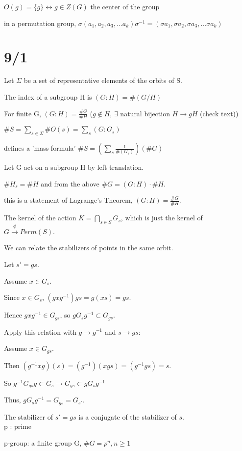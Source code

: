 \documentclass[12pt]{article}
\newcommand{\inv}{^{-1}}
\begin{document}
$O(g) = \{g\} \leftrightarrow g \in Z(G)$ the center of the group

in a permutation group, $\sigma (a_1, a_2, a_3, ... a_k) \sigma^{-1} = (\sigma a_1, \sigma a_2, \sigma a_3, ... \sigma a_k)$

\section{9/1}

\noindent
Let $\Sigma$ be a set of representative elements of the orbits of S.

The index of a subgroup H is $(G : H) = \#(G/H)$

For finite G, $(G:H) = \frac{\#G}{\#H}$ ($g \not \in H$, $\exists$ natural bijection $H \to gH$ (check text))

$\#S = \sum_{s \in \Sigma}\#O(s) = \sum_s(G:G_s)$

defines a 'mass formula' $\#S = (\sum_s\frac{1}{\#(G_s)})(\#G)$

\noindent
Let G act on a subgroup H by left translation.

$\#H_s = \#H$ and from the above $\#G = (G:H) \cdot \#H$. 

this is a statement of Lagrange's Theorem, $(G:H) = \frac{\#G}{\#H}$.

\noindent
The kernel of the action $K = \bigcap_{s \in S}G_s$, which is just the kernel of $G \xrightarrow{\phi} Perm(S)$.

\noindent
We can relate the stabilizers of points in the same orbit.

Let $s' = gs$.

Assume $x \in G_s$.  

Since $x \in G_s$, $(gxg^{-1})gs = g(xs) = gs$.

Hence $gxg^{-1} \in G_{gs}$, so $gG_sg^{-1} \subset G_{gs}$.

Apply this relation with $g \to g^{-1}$ and $s \to gs$:

Assume $x \in G_{gs}$.

Then $(g\inv xg)(s) = (g\inv)(xgs) = (g\inv gs) = s$.

So $g\inv G_{gs}g \subset G_s \to G_{gs} \subset gG_sg\inv$

\noindent
Thus, $gG_sg\inv = G_{gs} = G_{s'}$.

The stabilizer of $s'=gs$ is a conjugate of the stabilizer of $s$.\\


\noindent
p : prime

\noindent
p-group: a finite group G, $\#G = p^n, n \geq 1$\\
\end{document}
